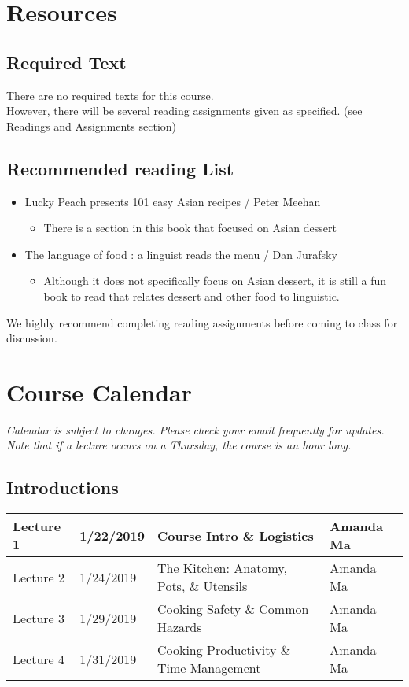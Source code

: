 \documentclass{article}
\begin{document}
\hrulefill 

\section{Resources}
\subsection{Required Text}
There are no required texts for this course. \\ However, there will be several reading assignments given as specified. (see Readings and Assignments section)

\subsection{Recommended reading List}

\begin{itemize}
    \item Lucky Peach presents 101 easy Asian recipes / Peter Meehan 
    \begin{itemize}
        \item There is a section in this book that focused on Asian dessert
    \end{itemize}
    \item The language of food : a linguist reads the menu / Dan Jurafsky
    \begin{itemize}
        \item Although it does not specifically focus on Asian dessert, it is still a fun book to read that relates dessert and other food to linguistic. 
    \end{itemize}
\end{itemize}

\noindent We highly recommend completing reading assignments before coming to class for discussion. 

\hrulefill 
\section{Course Calendar}
\textit{\small *Calendar is subject to changes. Please check your email frequently for updates. Note that if a lecture occurs on a Thursday, the course is an hour long.}

\subsection*{Introductions}
\vspace{0.5em} \begin{tabular}{|l|l|l|l|}
\hline 
 Lecture 1 & 1/22/2019  & Course Intro \& Logistics & Amanda Ma\\
\hline
 Lecture 2 &  1/24/2019 & The Kitchen: Anatomy, Pots, \& Utensils & Amanda Ma\\
\hline
 Lecture 3 &  1/29/2019 & Cooking Safety \& Common Hazards & Amanda Ma\\
\hline
 Lecture 4 & 1/31/2019 & Cooking Productivity \& Time Management & Amanda Ma\\
\hline
\end{tabular}
\end{document}
